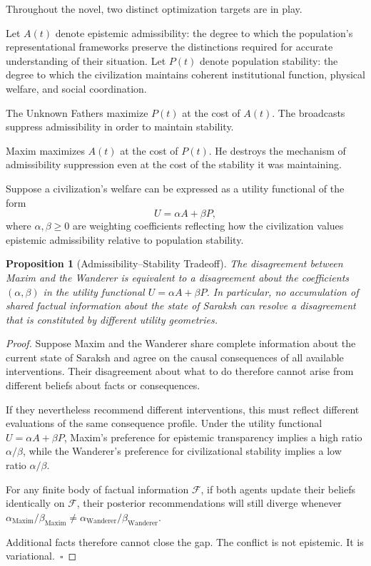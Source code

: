 \documentclass[12pt, a4paper]{article}
\theoremstyle{plain}
\newtheorem{proposition}[theorem]{Proposition}
\theoremstyle{definition}
\theoremstyle{remark}
\begin{document}
Throughout the novel, two distinct optimization
targets are in play.

Let $A(t)$ denote epistemic admissibility: the
degree to which the population's representational
frameworks preserve the distinctions required
for accurate understanding of their situation.
Let $P(t)$ denote population stability: the
degree to which the civilization maintains
coherent institutional function, physical
welfare, and social coordination.

The Unknown Fathers maximize $P(t)$ at the
cost of $A(t)$. The broadcasts suppress
admissibility in order to maintain stability.

Maxim maximizes $A(t)$ at the cost of $P(t)$.
He destroys the mechanism of admissibility
suppression even at the cost of the stability
it was maintaining.

Suppose a civilization's welfare can be expressed
as a utility functional of the form
\[
U = \alpha A + \beta P,
\]
where $\alpha, \beta \geq 0$ are weighting
coefficients reflecting how the civilization
values epistemic admissibility relative to
population stability.

\begin{proposition}[Admissibility--Stability Tradeoff]
\label{prop:tradeoff2}
The disagreement between Maxim and the Wanderer
is equivalent to a disagreement about the
coefficients $(\alpha, \beta)$ in the utility
functional $U = \alpha A + \beta P$. In
particular, no accumulation of shared factual
information about the state of Saraksh can
resolve a disagreement that is constituted
by different utility geometries.
\end{proposition}

\begin{proof}
Suppose Maxim and the Wanderer share complete
information about the current state of Saraksh
and agree on the causal consequences of
all available interventions. Their disagreement
about what to do therefore cannot arise from
different beliefs about facts or consequences.

If they nevertheless recommend different
interventions, this must reflect different
evaluations of the same consequence profile.
Under the utility functional $U = \alpha A
+ \beta P$, Maxim's preference for epistemic
transparency implies a high ratio $\alpha/\beta$,
while the Wanderer's preference for civilizational
stability implies a low ratio $\alpha/\beta$.

For any finite body of factual information
$\mathcal{F}$, if both agents update
their beliefs identically on $\mathcal{F}$,
their posterior recommendations will still
diverge whenever $\alpha_{\text{Maxim}}/\beta_{\text{Maxim}}
\neq \alpha_{\text{Wanderer}}/\beta_{\text{Wanderer}}$.

Additional facts therefore cannot close the gap.
The conflict is not epistemic. It is
variational.~$\square$
\end{proof}
\end{document}
